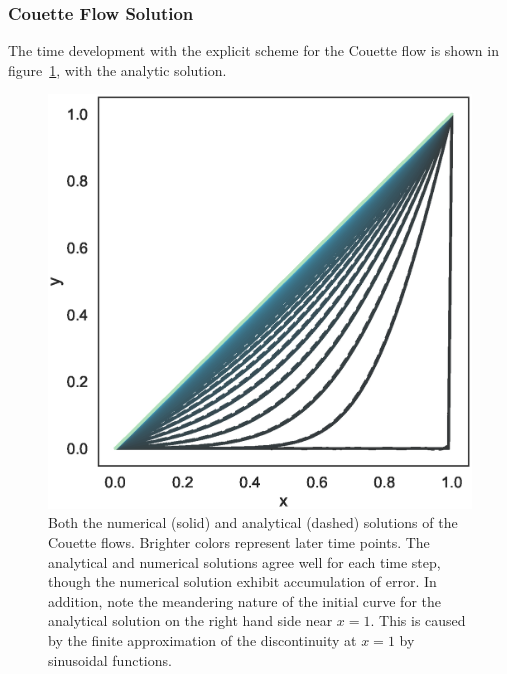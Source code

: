 \documentclass[aps,reprint]{revtex4-1}
\begin{document}
\subsubsection{Couette Flow Solution}
The time development with the explicit scheme for the Couette flow is shown in
figure~\ref{fig:couettenumanalytic}, with the analytic solution.
\begin{figure}[ht]
  \centering
  \includegraphics[width=\columnwidth]{figures/couette_numeric_vs_analytical.eps}
  \caption{\label{fig:couettenumanalytic} Both the numerical (solid) and analytical
    (dashed) solutions of the Couette flows. Brighter colors represent later time
    points. The analytical and numerical solutions agree well for each time
    step, though the numerical solution exhibit accumulation of error. In
    addition, note the meandering nature of the initial curve for the analytical
  solution on the right hand side near \(x=1\). This is caused by the finite
  approximation of the discontinuity at \(x=1\) by sinusoidal functions.}
\end{figure}
\end{document}
